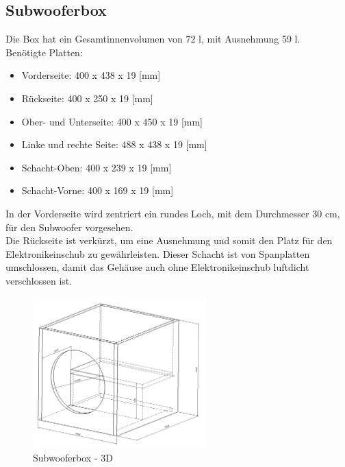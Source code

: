 \subsection{Subwooferbox}
Die Box hat ein Gesamtinnenvolumen von 72 l, mit Ausnehmung 59 l.\\
Benötigte Platten:
\begin{itemize}
	\item Vorderseite: 400 x 438 x 19 [mm]
	\item Rückseite: 400 x 250 x 19 [mm]
	\item Ober- und Unterseite: 400 x 450 x 19 [mm]
	\item Linke und rechte Seite: 488 x 438 x 19 [mm]
	\item Schacht-Oben: 400 x 239 x 19 [mm]
	\item Schacht-Vorne: 400 x 169 x 19 [mm]
\end{itemize}
In der Vorderseite wird zentriert ein rundes Loch, mit dem Durchmesser 30 cm, für den Subwoofer vorgesehen.\\
Die Rückseite ist verkürzt, um eine Ausnehmung und somit den Platz für den Elektronikeinschub zu gewährleisten.
Dieser Schacht ist von Spanplatten umschlossen, damit das Gehäuse auch ohne Elektronikeinschub luftdicht verschlossen ist.
\begin{figure} [H]
	\centering
	\includegraphics[width=0.6\textwidth]{img/Fertigungsunterlagen/Subwooferbox.png}
	\caption{Subwooferbox - 3D}
	\label {fig:8.11.1}
\end{figure}


